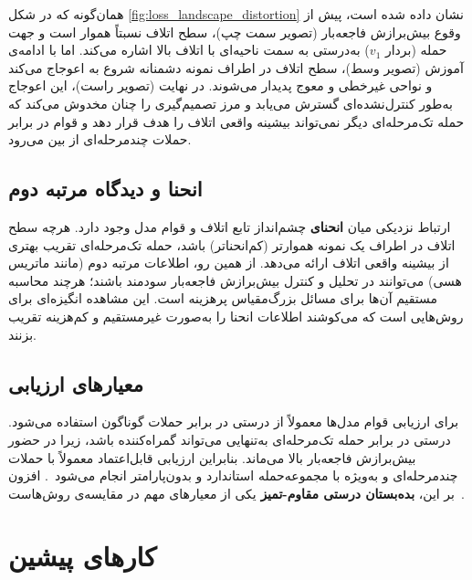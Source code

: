 \documentclass[11pt]{article}
\begin{document}
همان‌گونه که در شکل \ref{fig:loss_landscape_distortion} نشان داده شده است،
پیش از وقوع بیش‌برازش فاجعه‌بار (تصویر سمت چپ)، سطح اتلاف نسبتاً هموار است
و جهت حمله‌  (بردار $v_1$) به‌درستی به سمت ناحیه‌ای با اتلاف بالا اشاره می‌کند.
اما با ادامه‌ی آموزش (تصویر وسط)، سطح اتلاف در اطراف نمونه‌ دشمنانه شروع به اعوجاج می‌کند
و نواحی غیرخطی و معوج پدیدار می‌شوند.
در نهایت (تصویر راست)، این اعوجاج به‌طور کنترل‌نشده‌ای گسترش می‌یابد
و مرز تصمیم‌گیری را چنان مخدوش می‌کند که حمله‌ تک‌مرحله‌ای دیگر نمی‌تواند
بیشینه‌ واقعی اتلاف را هدف قرار دهد و قوام در برابر حملات چندمرحله‌ای از بین می‌رود.

\subsection{انحنا و دیدگاه مرتبه دوم}

ارتباط نزدیکی میان \textbf{انحنای} چشم‌انداز تابع اتلاف و قوام مدل وجود دارد.
هرچه سطح اتلاف در اطراف یک نمونه هموارتر (کم‌انحناتر) باشد،
حمله‌ تک‌مرحله‌ای تقریب بهتری از بیشینه‌ واقعی اتلاف ارائه می‌دهد.
از همین رو، اطلاعات مرتبه دوم (مانند ماتریس هسی) می‌توانند در تحلیل و کنترل بیش‌برازش فاجعه‌بار سودمند باشند؛
هرچند محاسبه‌ مستقیم آن‌ها برای مسائل بزرگ‌مقیاس پرهزینه است.
این مشاهده انگیزه‌ای برای روش‌هایی است که می‌کوشند اطلاعات انحنا را به‌صورت غیرمستقیم و کم‌هزینه تقریب بزنند.

\subsection[معیارهای ارزیابی]{معیارهای ارزیابی}

برای ارزیابی قوام مدل‌ها معمولاً از درستی در برابر حملات گوناگون استفاده می‌شود.
درستی در برابر حمله‌ تک‌مرحله‌ای به‌تنهایی می‌تواند گمراه‌کننده باشد،
زیرا در حضور بیش‌برازش فاجعه‌بار بالا می‌ماند.
بنابراین ارزیابی قابل‌اعتماد معمولاً با حملات چندمرحله‌ای و به‌ویژه با
مجموعه‌حمله‌ استاندارد و بدون‌پارامتر  انجام می‌شود~\cite{croce2020reliable}.
افزون بر این، \textbf{بده‌بستان درستی مقاوم-تمیز}
یکی از معیارهای مهم در مقایسه‌ی روش‌هاست~\cite{tsipras2019robustness}.

\section{کارهای پیشین}\label{بخش:کارهای‌پیشین}
\end{document}
